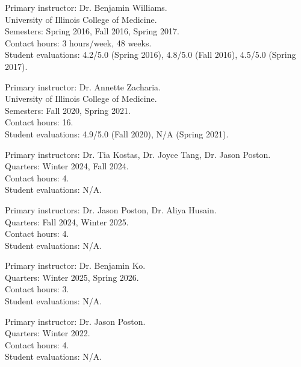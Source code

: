 \documentclass{komacv}
\begin{document}

{Primary instructor: Dr. Benjamin Williams.\\
University of Illinois College of Medicine.\\
Semesters: Spring 2016, Fall 2016, Spring 2017.\\
Contact hours: 3 hours/week, 48 weeks.\\
Student evaluations: 4.2/5.0 (Spring 2016), 4.8/5.0 (Fall 2016), 4.5/5.0 (Spring 2017).}

{Primary instructor: Dr. Annette Zacharia.\\
University of Illinois College of Medicine.\\
Semesters: Fall 2020, Spring 2021.\\
Contact hours: 16.\\
Student evaluations: 4.9/5.0 (Fall 2020), N/A (Spring 2021).}

{Primary instructors: Dr. Tia Kostas, Dr. Joyce Tang, Dr. Jason Poston.\\
Quarters: Winter 2024, Fall 2024.\\
Contact hours: 4.\\
Student evaluations: N/A.}

{Primary instructors: Dr. Jason Poston, Dr. Aliya Husain.\\
Quarters: Fall 2024, Winter 2025.\\
Contact hours: 4.\\
Student evaluations: N/A.}

{Primary instructor: Dr. Benjamin Ko.\\
Quarters: Winter 2025, Spring 2026.\\
Contact hours: 3.\\
Student evaluations: N/A.}

\begin{minipage}{\linewidth}

{Primary instructor: Dr. Jason Poston.\\
Quarters: Winter 2022.\\
Contact hours: 4.\\
Student evaluations: N/A.}
\end{minipage}
\end{document}

